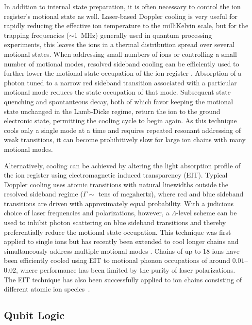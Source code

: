 \documentclass[%
12pt,
 amsmath,amssymb,
]{revtex4-2}
\begin{document}
In addition to internal state preparation, it is often necessary to control the ion register's motional state as well. Laser-based Doppler cooling is very useful for rapidly reducing the effective ion temperature to the milliKelvin scale, but for the trapping frequencies ($\sim$1~MHz) generally used in quantum processing experiments, this leaves the ions in a thermal distribution spread over several motional states.  When addressing small numbers of ions or controlling a small number of motional modes, resolved sideband cooling can be efficiently used to further lower the motional state occupation of the ion register \cite{DiedrichZeroPoint1989,MonroeCNOT1995}. Absorption of a photon tuned to a narrow red sideband transition associated with a particular motional mode reduces the state occupation of that mode. Subsequent state quenching and spontanteous decay, both of which favor keeping the motional state unchanged in the Lamb-Dicke regime, return the ion to the ground electronic state, permitting the cooling cycle to begin again.  As this technique cools only a single mode at a time and requires repeated resonant addressing of weak transitions, it can become prohibitively slow for large ion chains with many motional modes.

Alternatively, cooling can be achieved by altering the light absorption profile of the ion register using electromagnetic induced transparency (EIT). Typical Doppler cooling uses atomic transitions with natural linewidths outside the resolved sideband regime ($\Gamma\sim$ tens of megahertz), where red and blue sideband transitions are driven with approximately equal probability.  With a judicious choice of laser frequencies and polarizations, however, a $\Lambda$-level scheme can be used to inhibit photon scattering on blue sideband transitions and thereby preferentially reduce the motional state occupation. This technique was first applied to single ions \cite{PhysRevLett.85.4458,roos2000experimental} but has recently been extended to cool longer chains and simultaneously address multiple motional modes \cite{lechner2016electromagnetically}. Chains of up to 18 ions have been efficiently cooled using EIT to motional phonon occupations of around $0.01$--$0.02$, where performance has been limited by the purity of laser polarizations. The EIT technique has also been successfully applied to ion chains consisting of different atomic ion species~\cite{lin2013sympathetic}.



\subsection{Qubit Logic}
\end{document}
